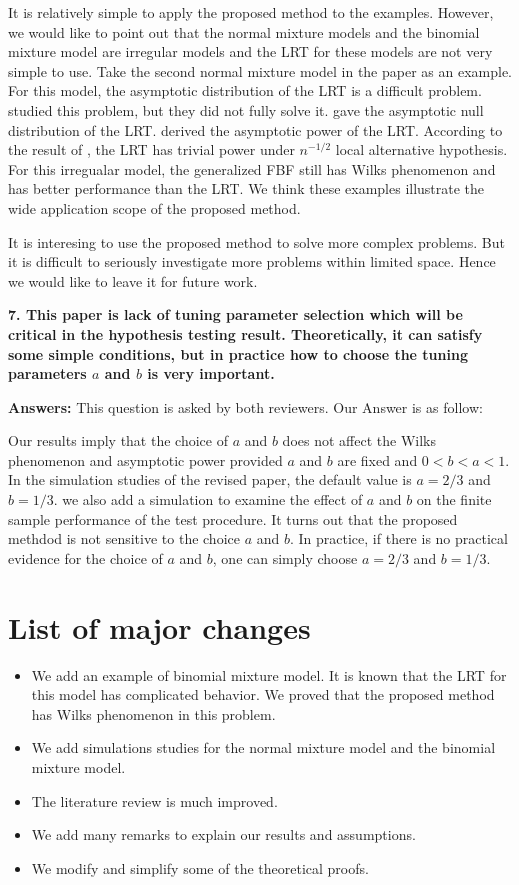\documentclass[11pt]{article}
\theoremstyle{plain}
\theoremstyle{definition}
\theoremstyle{remark}
\begin{document}
It is relatively simple to apply the proposed method to the examples.
However, we would like to point out that the normal mixture models and the binomial mixture model are irregular models and the LRT for these models are not very simple to use.
Take the second normal mixture model in the paper as an example.
For this model, the asymptotic distribution of the LRT is a difficult problem.
\cite{bickel1993} studied this problem, but they did not fully solve it.
\cite{LIU200461} gave the asymptotic null distribution of the LRT.
\cite{HALL2005158} derived the asymptotic power of the LRT.
According to the result of \cite{HALL2005158}, the LRT has trivial power under $n^{-1/2}$ local alternative hypothesis.
For this irregualar model, the generalized FBF still has Wilks phenomenon and has better performance than the LRT.
We think these examples illustrate the wide application scope of the proposed method.

It is interesing to use the proposed method to solve more complex problems.
But it is difficult to seriously investigate more problems within limited space.
Hence we would like to leave it for future work.

\textbf{
    7. This paper is lack of tuning parameter selection which will be critical in the hypothesis testing result.
    Theoretically, it can satisfy some simple conditions, but in practice how to choose the tuning parameters $a$ and $b$ is very important.
}

\textbf{Answers:}
This question is asked by both reviewers.
Our Answer is as follow:

Our results imply that the choice of $a$ and $b$ does not affect the Wilks phenomenon and asymptotic power provided $a$ and $b$ are fixed and $0<b<a<1$.
In the simulation studies of the revised paper, the default value is $a=2/3$ and $b= 1/3$.
we also add a simulation to examine the effect of $a$ and $b$ on the finite sample performance of the test procedure.
It turns out that the proposed methdod is not sensitive to the choice $a$ and $b$.
In practice, if there is no practical evidence for the choice of $a$ and $b$, one can simply choose $a = 2/3$ and $b = 1/3$.




\section{List of major changes}
\begin{itemize}
    \item 
We add an example of binomial mixture model.
It is known that the LRT for this model has complicated behavior.
We proved that the proposed method has Wilks phenomenon in this problem.
    \item
        We add simulations studies for the normal mixture model and the binomial mixture model.
    \item
        The literature review is much improved.
    \item
        We add many remarks to explain our results and assumptions.
    \item
        We modify and simplify some of the theoretical proofs.
\end{itemize}






\end{document}
